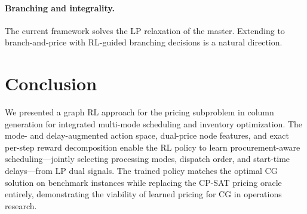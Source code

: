 \documentclass[11pt]{article}
\begin{document}
\paragraph{Branching and integrality.}
The current framework solves the LP relaxation of the master.
Extending to branch-and-price with RL-guided branching decisions is a natural direction.

\section{Conclusion}\label{sec:conclusion}

We presented a graph RL approach for the pricing subproblem in column generation for integrated multi-mode scheduling and inventory optimization.
The mode- and delay-augmented action space, dual-price node features, and exact per-step reward decomposition enable the RL policy to learn procurement-aware scheduling---jointly selecting processing modes, dispatch order, and start-time delays---from LP dual signals.
The trained policy matches the optimal CG solution on benchmark instances while replacing the CP-SAT pricing oracle entirely, demonstrating the viability of learned pricing for CG in operations research.




\end{document}

